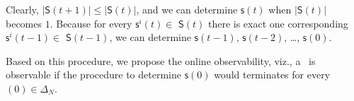 Clearly, $|\mathsf{S}(t+1)|\le|\mathsf{S}(t)|$, and we can determine $\mathsf{s}(t)$  when $|\mathsf{S}(t)|$ becomes $1$. Because for every $\mathsf{s}^{i}(t)\in $ $\mathsf{S}(t)$ there is exact one corresponding $\mathsf{s}^{i}(t-1)\in $ $\mathsf{S}(t-1)$, we can determine $\mathsf{s}(t-1)$, $\mathsf{s}(t-2)$, \ldots, $\mathsf{s}(0)$.

Based on this procedure, we propose the online observability, viz., a \BCN\ is observable if the procedure to determine $\mathsf{s}(0)$ would terminates for every \State$(0)\in \Delta_N$.    







